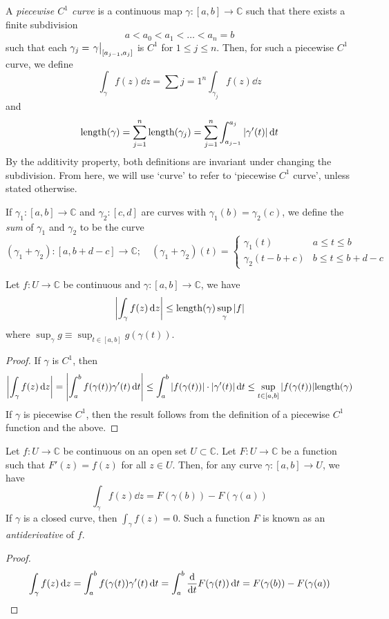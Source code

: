 \begin{definition}
	A \textit{piecewise \( C^1 \) curve} is a continuous map \( \gamma \colon [a,b] \to \mathbb C \) such that there exists a finite subdivision
	\[ a < a_0 < a_1 < \dots < a_n = b \]
	such that each \( \gamma_j = \eval{\gamma}_{[a_{j-1}, a_j]} \) is \( C^1 \) for \( 1 \leq j \leq n \).
	Then, for such a piecewise \( C^1 \) curve, we define
	\[ \int_\gamma f(z) \dd{z} = \sum{j=1}^n \int_{\gamma_j} f(z) \dd{z} \]
	and
	\[ \mathrm{length}(\gamma) = \sum_{j=1}^n \mathrm{length}(\gamma_j) = \sum_{j=1}^n \int_{a_{j-1}}^{a_j} \abs{\gamma'(t)} \dd{t} \]
	By the additivity property, both definitions are invariant under changing the subdivision.
	From here, we will use `curve' to refer to `piecewise \( C^1 \) curve', unless stated otherwise.
\end{definition}
\begin{definition}
	If \( \gamma_1 \colon [a,b] \to \mathbb C \) and \( \gamma_2 \colon [c,d] \) are curves with \( \gamma_1(b) = \gamma_2(c) \), we define the \textit{sum} of \( \gamma_1 \) and \( \gamma_2 \) to be the curve
	\[ (\gamma_1 + \gamma_2) \colon [a,b+d-c] \to \mathbb C;\quad (\gamma_1 + \gamma_2)(t) = \begin{cases}
		\gamma_1(t) & a \leq t \leq b \\
		\gamma_2(t - b + c) & b \leq t \leq b + d - c
	\end{cases} \]
\end{definition}
\begin{proposition}
	Let \( f \colon U \to \mathbb C \) be continuous and \( \gamma \colon [a,b] \to \mathbb C \), we have
	\[ \abs{\int_\gamma f(z) \dd{z}} \leq \mathrm{length}(\gamma) \sup_\gamma \abs{f} \]
	where \( \sup_\gamma g \equiv \sup_{t \in [a,b]} g(\gamma(t)) \).
\end{proposition}
\begin{proof}
	If \( \gamma \) is \( C^1 \), then
	\[ \abs{\int_\gamma f(z) \dd{z}} = \abs{\int_a^b f(\gamma(t)) \gamma'(t) \dd{t}} \leq \int_a^b \abs{f(\gamma(t))} \cdot \abs{\gamma'(t)} \dd{t} \leq \sup_{t \in [a,b]} \abs{f(\gamma(t))} \mathrm{length}(\gamma) \]
	If \( \gamma \) is piecewise \( C^1 \), then the result follows from the definition of a piecewise \( C^1 \) function and the above.
\end{proof}
\begin{theorem}
	Let \( f \colon U \to \mathbb C \) be continuous on an open set \( U \subset \mathbb C \).
	Let \( F \colon U \to \mathbb C \) be a function such that \( F'(z) = f(z) \) for all \( z \in U \).
	Then, for any curve \( \gamma \colon [a,b] \to U \), we have
	\[ \int_\gamma f(z) \dd{z} = F(\gamma(b)) - F(\gamma(a)) \]
	If \( \gamma \) is a closed curve, then \( \int_\gamma f(z) = 0 \).
	Such a function \( F \) is known as an \textit{antiderivative} of \( f \).
\end{theorem}
\begin{proof}
	\[ \int_\gamma f(z) \dd{z} = \int_a^b f(\gamma(t)) \gamma'(t) \dd{t} = \int_a^b \dv{t} F(\gamma(t)) \dd{t} = F(\gamma(b)) - F(\gamma(a)) \]
\end{proof}
